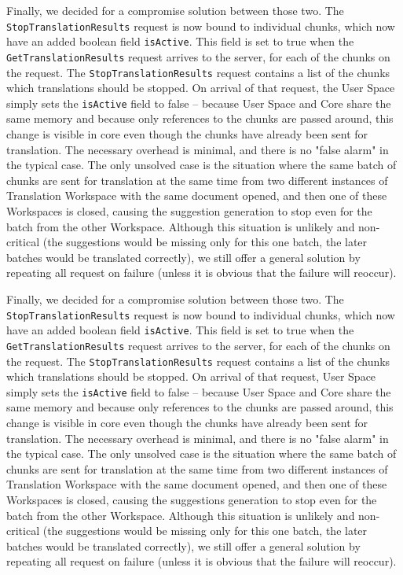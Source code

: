 {Finally, we decided for a compromise solution between those two. The {\tt StopTranslationResults} request is now bound to individual chunks, which now have an added boolean field {\tt isActive}. This field is set to true when the {\tt GetTranslationResults} request arrives to the server, for each of the chunks on the request. The {\tt StopTranslationResults} request contains a list of the chunks which translations should be stopped. On arrival of that request, the User Space simply sets the {\tt isActive} field to false -- because User Space and Core share the same memory and because only references to the chunks are passed around, this change is visible in core even though the chunks have already been sent for translation. The necessary overhead is minimal, and there is no "false alarm" in the typical case. The only unsolved case is the situation where the same batch of chunks are sent for translation at the same time from two different instances of Translation Workspace with the same document opened, and then one of these Workspaces is closed, causing the suggestion generation to stop even for the batch from the other Workspace. Although this situation is unlikely and non-critical (the suggestions would be missing only for this one batch, the later batches would be translated correctly), we still offer a general solution by repeating all request on failure (unless it is obvious that the failure will reoccur).

Finally, we decided for a compromise solution between those two. The {\tt StopTranslationResults} request is now bound to individual chunks, which now have an added boolean field {\tt isActive}. This field is set to true when the {\tt GetTranslationResults} request arrives to the server, for each of the chunks on the request. The {\tt StopTranslationResults} request contains a list of the chunks which translations should be stopped. On arrival of that request, User Space simply sets the {\tt isActive} field to false -- because User Space and Core share the same memory and because only references to the chunks are passed around, this change is visible in core even though the chunks have already been sent for translation. The necessary overhead is minimal, and there is no "false alarm" in the typical case. The only unsolved case is the situation where the same batch of chunks are sent for translation at the same time from two different instances of Translation Workspace with the same document opened, and then one of these Workspaces is closed, causing the suggestions generation to stop even for the batch from the other Workspace. Although this situation is unlikely and non-critical (the suggestions would be missing only for this one batch, the later batches would be translated correctly), we still offer a general solution by repeating all request on failure (unless it is obvious that the failure will reoccur).

}
